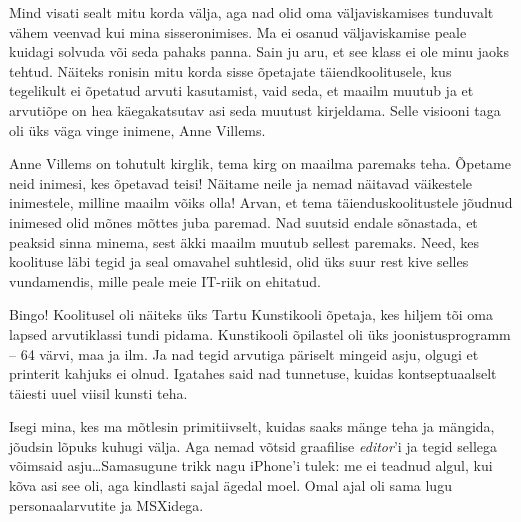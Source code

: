 
Mind visati sealt mitu korda välja, aga nad olid oma väljaviskamises 
tunduvalt vähem veenvad kui mina sisseronimises. Ma ei osanud väljaviskamise peale
kuidagi solvuda või seda pahaks panna. 
Sain ju aru, et see klass ei ole minu jaoks tehtud. Näiteks ronisin 
mitu korda sisse õpetajate täiendkoolitusele, kus tegelikult ei õpetatud 
arvuti kasutamist, vaid seda, et maailm muutub ja et arvutiõpe on 
hea käegakatsutav asi seda muutust kirjeldama. Selle visiooni taga oli üks 
väga vinge inimene, Anne Villems.

Anne Villems on tohutult kirglik, tema kirg on maailma 
paremaks teha. Õpetame neid inimesi, kes õpetavad teisi! Näitame neile ja nemad
näitavad väikestele inimestele, milline maailm võiks olla! 
Arvan, et tema täienduskoolitustele jõudnud inimesed 
olid mõnes mõttes juba paremad. Nad suutsid endale 
sõnastada, et peaksid sinna minema, sest äkki maailm muutub sellest paremaks. Need, 
kes koolituse läbi tegid ja seal omavahel suhtlesid, 
olid üks suur rest kive selles vundamendis, mille peale meie IT-riik on 
ehitatud.


Bingo! Koolitusel oli näiteks
üks Tartu Kunstikooli õpetaja, kes hiljem tõi oma lapsed 
arvutiklassi tundi pidama. Kunstikooli õpilastel oli üks
joonistusprogramm – 64 värvi, maa ja ilm. Ja nad tegid arvutiga päriselt mingeid asju, olgugi et printerit kahjuks ei olnud. 
Igatahes said nad tunnetuse, kuidas kontseptuaalselt täiesti uuel viisil kunsti teha. 

Isegi mina, kes ma mõtlesin primitiivselt, kuidas saaks mänge teha ja 
mängida, jõudsin lõpuks kuhugi välja. Aga nemad võtsid 
graafilise \emph{editor}'i ja tegid sellega võimsaid
asju\ldots Samasugune trikk nagu iPhone'i tulek: me ei teadnud algul, kui kõva asi see oli, aga kindlasti 
sajal ägedal moel. Omal ajal oli sama lugu personaalarvutite ja MSXidega.


